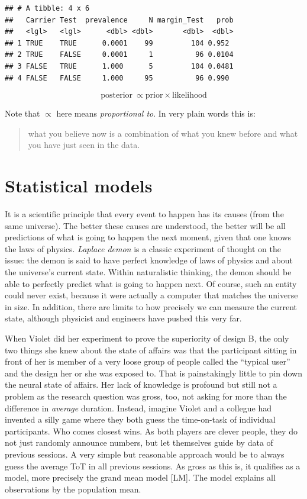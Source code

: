 \documentclass[]{svmono}
\begin{document}
\begin{verbatim}
## # A tibble: 4 x 6
##   Carrier Test  prevalence     N margin_Test   prob
##   <lgl>   <lgl>      <dbl> <dbl>       <dbl>  <dbl>
## 1 TRUE    TRUE      0.0001    99         104 0.952 
## 2 TRUE    FALSE     0.0001     1          96 0.0104
## 3 FALSE   TRUE      1.000      5         104 0.0481
## 4 FALSE   FALSE     1.000     95          96 0.990
\end{verbatim}

\[\text{posterior}\ \propto \text{prior}\times\text{likelihood}\]

Note that \(\propto\) here means \emph{proportional to}. In very plain
words this is:

\begin{quote}
what you believe now is a combination of what you knew before and what
you have just seen in the data.
\end{quote}

\section{Statistical models}\label{statistical-models}

It is a scientific principle that every event to happen has its causes
(from the same universe). The better these causes are understood, the
better will be all predictions of what is going to happen the next
moment, given that one knows the laws of physics. \emph{Laplace demon}
is a classic experiment of thought on the issue: the demon is said to
have perfect knowledge of laws of physics and about the universe's
current state. Within naturalistic thinking, the demon should be able to
perfectly predict what is going to happen next. Of course, such an
entity could never exist, because it were actually a computer that
matches the universe in size. In addition, there are limits to how
precisely we can measure the current state, although physicist and
engineers have pushed this very far.

When Violet did her experiment to prove the superiority of design B, the
only two things she knew about the state of affairs was that the
participant sitting in front of her is member of a very loose group of
people called the ``typical user'' and the design her or she was exposed
to. That is painstakingly little to pin down the neural state of
affairs. Her lack of knowledge is profound but still not a problem as
the research question was gross, too, not asking for more than the
difference in \emph{average} duration. Instead, imagine Violet and a
collegue had invented a silly game where they both guess the
time-on-task of individual participants. Who comes closest wins. As both
players are clever people, they do not just randomly announce numbers,
but let themselves guide by data of previous sessions. A very simple but
reasonable approach would be to always guess the average ToT in all
previous sessions. As gross as this is, it qualifies as a model, more
precisely the grand mean model {[}LM{]}. The model explains all
observations by the population mean.
\end{document}
